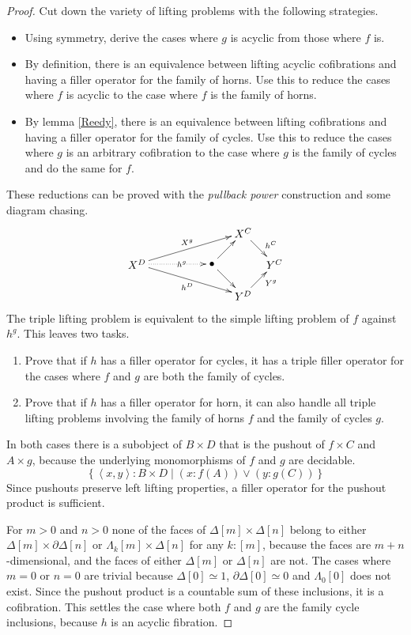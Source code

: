 \documentclass{tac}
\newcommand\set[1]{\left\{#1\right\}}
\newcommand\of{:}
\newcommand\simplex\Delta
\newcommand\cycle{\partial\Delta}
\newcommand\horn\Lambda
\newcommand\tuplet[1]{\left\langle #1 \right\rangle}
\begin{document}
\begin{proof} 
Cut down the variety of lifting problems with the following strategies.
\begin{itemize}
\item Using symmetry, derive the cases where $g$ is acyclic from those where $f$ is.
\item By definition, there is an equivalence between lifting acyclic cofibrations and having a filler operator for the family of horns. Use this to reduce the cases where $f$ is acyclic to the case where $f$ is the family of horns.
\item By lemma \ref{Reedy}, there is an equivalence between lifting cofibrations and having a filler operator for the family of cycles. Use this to reduce the cases where $g$ is an arbitrary cofibration to the case where $g$ is the family of cycles and do the same for $f$.
\end{itemize}
These reductions can be proved with the \emph{pullback power} construction and some diagram chasing.
\[\xy
(34,20)*+{X^C}="top",(0,10)*+{X^D}="left",(24,10)*+{\bullet}="middle",(44,10)*+{Y^C}="right",(34,0)*+{Y^D}="bottom"
\ar^{X^g} "left";"top" \ar@{.>}|(.6){h^g} "left";"middle" \ar_{h^D} "left";"bottom" \ar "middle";"bottom"
\ar "middle";"top" \ar^(.6){h^C} "top";"right" \ar_(.6){Y^g} "bottom";"right"
\endxy\]
The triple lifting problem is equivalent to the simple lifting problem of $f$ against $h^g$.
This leaves two tasks.
\begin{enumerate}
\item Prove that if $h$ has a filler operator for cycles, it has a triple filler operator for the cases where $f$ and $g$ are both the family of cycles.
\item Prove that if $h$ has a filler operator for horn, it can also handle all triple lifting problems involving the family of horns $f$ and the family of cycles $g$.
\end{enumerate}

In both cases there is a subobject of $B\times D$ that is the pushout of $f\times C$ and $A\times g$, because the underlying monomorphisms of $f$ and $g$ are decidable.
\[ \set{\tuplet{x,y}\of B\times D\middle| (x\of f(A)) \vee (y\of g(C)) }\]
Since pushouts preserve left lifting properties, a filler operator for the pushout product is sufficient.

For $m > 0$ and $n > 0$ none of the faces of $\simplex[m]\times \simplex[n]$ belong to either $\simplex[m]\times \cycle[n]$ or $\horn_k[m]\times\simplex[n]$ for any $k\of[m]$, because the faces are $m+n$-dimensional, and the faces of either $\simplex[m]$ or $\simplex[n]$ are not. The cases where $m=0$ or $n=0$ are trivial because $\simplex[0] \simeq 1$, $\cycle[0]\simeq 0$ and $\horn_0[0]$ does not exist. Since the pushout product is a countable sum of these inclusions, it is a cofibration. This settles the case where both $f$ and $g$ are the family cycle inclusions, because $h$ is an acyclic fibration.


\end{proof}
\end{document}
